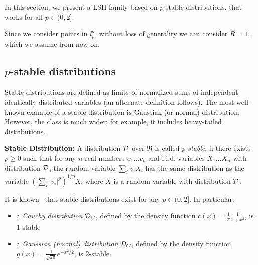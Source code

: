 \documentclass[12pt]{article}
\begin{document}
 In this section, we present a LSH family based on
$p$-stable distributions, that works for all $p \in (0,2]$. 

Since we consider points in
$l_p^d$, without loss of generality we can consider $R=1$, which we assume
from now on.

\subsection{$p$-stable distributions}

Stable distributions \cite{Zol} are defined as limits of normalized sums
of independent identically distributed variables (an alternate definition
follows).  The most well-known example of a stable distribution is
Gaussian (or normal) distribution.  However, the class is much wider; for
example, it includes heavy-tailed distributions.

{\noindent \bf Stable Distribution:} A distribution ${\cal D}$ over $\Re$ is called {\em $p$-stable}, if there exists $p \ge 0$ such that for any $n$ real numbers $v_1 \ldots v_n$ and i.i.d. variables $X_1 \ldots X_n$ with distribution ${\cal D}$, the random variable $\sum_i v_i X_i$ has the same distribution as the variable $(\sum_i |v_i|^p)^{1/p} X$, where $X$ is a random variable with distribution ${\cal D}$.

It is known~\cite{Zol} that stable distributions exist for any $p \in (0,2]$.
In particular:
\begin{itemize}
\item a {\em Cauchy distribution} ${\cal D}_C$, defined by the density function
$c(x)=\frac{1}{\pi} \frac{1}{1+x^2}$, is $1$-stable
\item a {\em Gaussian (normal) distribution} ${\cal D}_G$, defined by the density function $g(x)= \frac{1}{\sqrt{2\pi}} e^{-x^2/2}$, is $2$-stable
\end{itemize}
\end{document}
